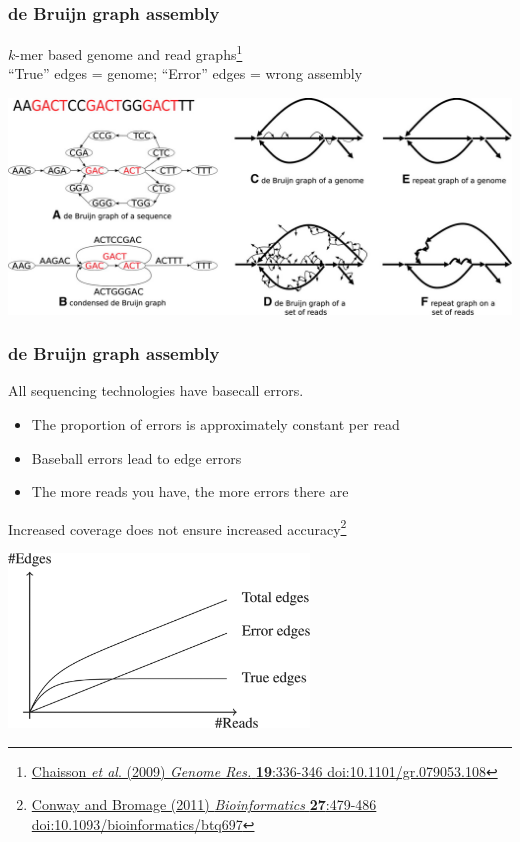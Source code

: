\begin{frame}
  \frametitle{de Bruijn graph assembly}
  $k$-mer based genome and read graphs\footnote{\tiny{\href{http://dx.doi.org/10.1101/gr.079053.108}{Chaisson \textit{et al}. (2009) \textit{Genome Res.} \textbf{19}:336-346 doi:10.1101/gr.079053.108}}}\\
  ``True'' edges = genome; ``Error'' edges = wrong assembly
  \begin{center}
    \includegraphics[width=1\textwidth]{images/de_bruijn_repeats}
  \end{center}  
\end{frame}

\begin{frame}
  \frametitle{de Bruijn graph assembly}
  All sequencing technologies have basecall errors.
  \begin{itemize}
    \item The proportion of errors is approximately constant per read
    \item Baseball errors lead to edge errors
    \item The more reads you have, the more errors there are
  \end{itemize}
  Increased coverage does not ensure increased accuracy\footnote{\tiny{\href{http://dx.doi.org/10.1093/bioinformatics/btq697}{Conway and Bromage (2011) \textit{Bioinformatics} \textbf{27}:479-486 doi:10.1093/bioinformatics/btq697}}}
  \begin{center}
    \includegraphics[width=0.6\textwidth]{images/de_bruijn_errors}
  \end{center}   
\end{frame}

